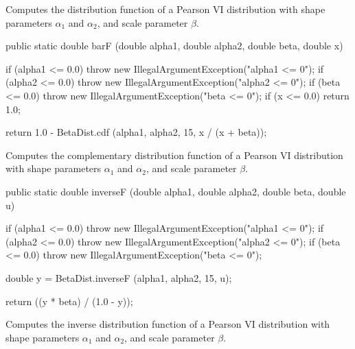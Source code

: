 \begin{tabb}
   Computes the distribution function of a Pearson VI distribution with
shape parameters $\alpha_1$
   and $\alpha_2$, and scale parameter $\beta$.
\end{tabb}
\begin{code}

   public static double barF (double alpha1, double alpha2,
                              double beta, double x)\begin{hide} {
      if (alpha1 <= 0.0)
         throw new IllegalArgumentException("alpha1 <= 0");
      if (alpha2 <= 0.0)
         throw new IllegalArgumentException("alpha2 <= 0");
      if (beta <= 0.0)
         throw new IllegalArgumentException("beta <= 0");
      if (x <= 0.0)
         return 1.0;

      return 1.0 - BetaDist.cdf (alpha1, alpha2, 15, x / (x + beta));
   }\end{hide}
\end{code}
\begin{tabb}
   Computes the complementary distribution function of a Pearson VI distribution
   with shape parameters $\alpha_1$ and $\alpha_2$, and scale parameter $\beta$.
\end{tabb}
\begin{code}

   public static double inverseF (double alpha1, double alpha2,
                                  double beta, double u)\begin{hide} {
      if (alpha1 <= 0.0)
         throw new IllegalArgumentException("alpha1 <= 0");
      if (alpha2 <= 0.0)
         throw new IllegalArgumentException("alpha2 <= 0");
      if (beta <= 0.0)
         throw new IllegalArgumentException("beta <= 0");

      double y = BetaDist.inverseF (alpha1, alpha2, 15, u);

      return ((y * beta) / (1.0 - y));
   }\end{hide}
\end{code}
\begin{tabb}
   Computes the inverse distribution function of a Pearson VI distribution
   with shape parameters $\alpha_1$ and $\alpha_2$, and scale parameter $\beta$.
\end{tabb}
